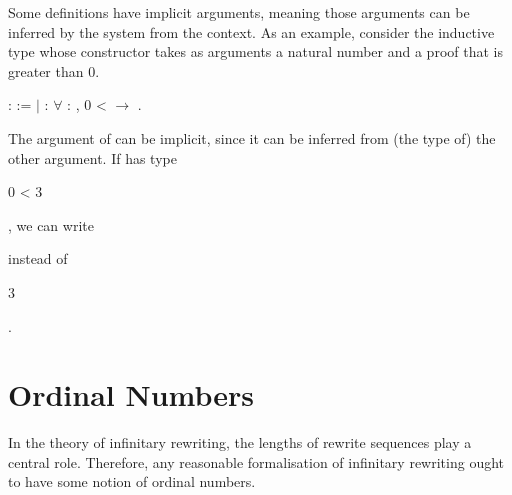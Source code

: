 Some definitions have implicit arguments, meaning those arguments can
be inferred by the system from the context. As an example, consider
the inductive type
 whose constructor
takes as arguments a natural number  and a proof that
 is greater than $0$.
\begin{singlespace}
\begin{coqdoccode}
\coqdocnoindent
{}
 :
 :=\coqdoceol
\coqdocindent{1.00em}
\ensuremath{|}  :
\ensuremath{\forall}  :
,
0 <  \ensuremath{\rightarrow}
.\coqdoceol
\end{coqdoccode}
\end{singlespace}
The argument  of
 can be implicit,
since it can be inferred from (the type of) the other argument. If
 has type \begin{coqdoccode}0 < 3\end{coqdoccode}, we can
write \begin{coqdoccode}
  \end{coqdoccode} instead
of \begin{coqdoccode} 3
  \end{coqdoccode}.



\section{Ordinal Numbers}\label{sec:ordimp}

In the theory of infinitary rewriting, the lengths of rewrite sequences play
a central role. Therefore, any reasonable formalisation of infinitary
rewriting ought to have some notion of ordinal numbers.

